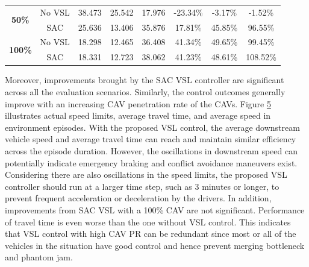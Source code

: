 \documentclass[11pt, letterpaper]{article}
\begin{document}
\begin{table}[!ht]
\begin{tabular}{@{}cccccccc@{}}
\multirow{2}{*}{\textbf{50\%}}                 & No VSL                                     & 38.473                       & 25.542                        & 17.976                    & -23.34\%                     & -3.17\%                       & -1.52\%                   \\
                                               & SAC                                        & 25.636                       & 13.406                        & 35.876                    & 17.81\%                      & 45.85\%                       & 96.55\%                   \\
\multirow{2}{*}{\textbf{100\%}}                & No VSL                                     & 18.298                       & 12.465                        & 36.408                    & 41.34\%                      & 49.65\%                       & 99.45\%                   \\
                                               & SAC                                        & 18.331                       & 12.723                        & 38.062                    & 41.23\%                      & 48.61\%                       & 108.52\%                  \\ \bottomrule
\end{tabular}
\end{table}

Moreover, improvements brought by the SAC VSL controller are significant across all the evaluation scenarios. Similarly, the control outcomes generally improve with an increasing CAV penetration rate of the CAVs. Figure \hyperref[fig:5]{5} illustrates actual speed limits, average travel time, and average speed in environment episodes. With the proposed VSL control, the average downstream vehicle speed and average travel time can reach and maintain similar efficiency across the episode duration. However, the oscillations in downstream speed can potentially indicate emergency braking and conflict avoidance maneuvers exist. Considering there are also oscillations in the speed limits, the proposed VSL controller should run at a larger time step, such as 3 minutes or longer, to prevent frequent acceleration or deceleration by the drivers. In addition, improvements from SAC VSL with a 100\% CAV are not significant. Performance of travel time is even worse than the one without VSL control. This indicates that VSL control with high CAV PR can be redundant since most or all of the vehicles in the situation have good control and hence prevent merging bottleneck and phantom jam.
\end{document}
